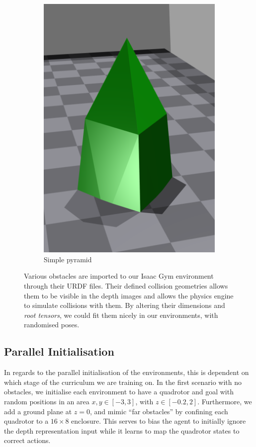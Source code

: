 \begin{figure}[H]
\begin{subfigure}[b]{0.3\textwidth}
         \includegraphics[width=\textwidth]{figures/6_/simple_pyramid.png}
         \caption{Simple pyramid}
         \label{fig:6_obst_simple_pyramid}
     \end{subfigure} 
    \caption{Various obstacles are imported to our Isaac Gym environment through their URDF files. Their defined collision geometries allows them to be visible in the depth images and allows the physics engine to simulate collisions with them. By altering their dimensions and \textit{root tensors}, we could fit them nicely in our environments, with randomised poses.}
     \label{fig:6_obstacles}
\end{figure}

\newpage
\subsection{Parallel Initialisation}
In regards to the parallel initialisation of the environments, this is dependent on which stage of the curriculum we are training on.
In the first scenario with no obstacles, we initialise each environment to have a quadrotor and goal with random positions in an area $x, y \in [-3, 3]$, with $z \in [-0.2, 2]$. Furthermore, we add a ground plane at $z = 0$, and mimic ``far obstacles'' by confining each quadrotor to a $16\times8$ enclosure. This serves to bias the agent to initially ignore the depth representation input while it learns to map the quadrotor states to correct actions. 

